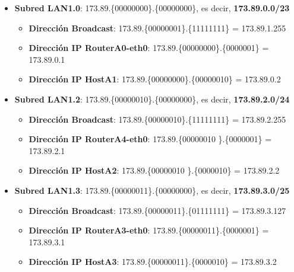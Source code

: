 \begin{itemize}
	\item{\textbf{Subred LAN1.0}:} 173.89.\{\textcolor{azul}{000000}\textcolor{rojo}{0}0\}.\{00000000\}, es decir, \textbf{173.89.0.0/23}
		\begin{itemize}
			\item{\textbf{Dirección Broadcast}}: 173.89.\{\textcolor{azul}{000000}\textcolor{rojo}{0}1\}.\{11111111\} = 173.89.1.255
			\item{\textbf{Dirección IP RouterA0-eth0}}: 173.89.\{\textcolor{azul}{000000}\textcolor{rojo}{0}0\}.\{0000001\} = 173.89.0.1
			\item{\textbf{Dirección IP HostA1}}: 173.89.\{\textcolor{azul}{000000}\textcolor{rojo}{0}0\}.\{00000010\} = 173.89.0.2
		\end{itemize}
	\item{\textbf{Subred LAN1.2}:} 173.89.\{\textcolor{azul}{000000}\textcolor{rojo}{10}\}.\{00000000\}, es decir, \textbf{173.89.2.0/24}
		\begin{itemize}
			\item{\textbf{Dirección Broadcast}}: 173.89.\{\textcolor{azul}{000000}\textcolor{rojo}{10}\}.\{11111111\} = 173.89.2.255
			\item{\textbf{Dirección IP RouterA4-eth0}}: 173.89.\{\textcolor{azul}{000000}\textcolor{rojo}{10} \}.\{0000001\} = 173.89.2.1
			\item{\textbf{Dirección IP HostA2}}: 173.89.\{\textcolor{azul}{000000}\textcolor{rojo}{10} \}.\{0000010\} = 173.89.2.2
		\end{itemize}
	\item{\textbf{Subred LAN1.3}:} 173.89.\{\textcolor{azul}{000000}\textcolor{rojo}{11}\}.\{\textcolor{rojo}{0}0000000\}, es decir, \textbf{173.89.3.0/25}
		\begin{itemize}
			\item{\textbf{Dirección Broadcast}}: 173.89.\{\textcolor{azul}{000000}\textcolor{rojo}{11}\}.\{\textcolor{rojo}{0}1111111\} = 173.89.3.127
			\item{\textbf{Dirección IP RouterA3-eth0}}: 173.89.\{\textcolor{azul}{000000}\textcolor{rojo}{11}\}.\{\textcolor{rojo}{0}000001\} = 173.89.3.1
			\item{\textbf{Dirección IP HostA3}}: 173.89.\{\textcolor{azul}{000000}\textcolor{rojo}{11}\}.\{\textcolor{rojo}{0}000010\} = 173.89.3.2
		\end{itemize}

\end{itemize}
